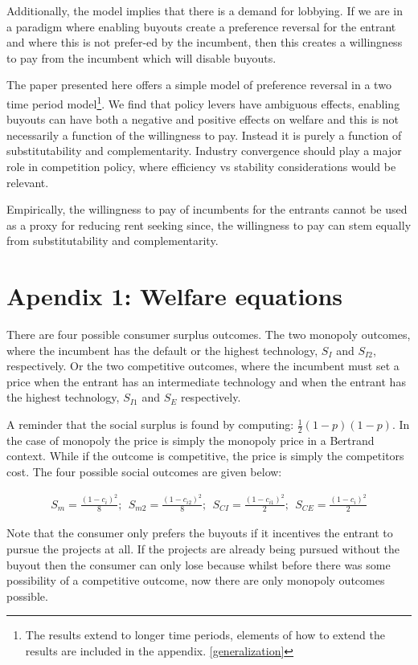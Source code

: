 \documentclass[11pt]{article}
\begin{document}
Additionally, the model implies that there is a demand for lobbying. If we are in a paradigm where enabling buyouts create a preference reversal for the entrant and where this is not prefer-ed by the incumbent, then this creates a willingness to pay from the incumbent which will disable buyouts. 


The paper presented here offers a simple model of preference reversal in a two time period model\footnote{The results extend to longer time periods, elements of how to extend the results are included in the appendix. \ref{generalization}}. We find that policy levers have ambiguous effects, enabling buyouts can have both a negative and positive effects on welfare and this is not necessarily a function of the willingness to pay. Instead it is purely a function of substitutability and complementarity. Industry convergence should play a major role in competition policy, where efficiency vs stability considerations would be relevant. 

Empirically, the willingness to pay of incumbents for the entrants cannot be used as a proxy for reducing rent seeking since, the willingness to pay can stem equally from substitutability and complementarity. 


\newpage
\section*{Apendix 1: Welfare equations}

There are four possible consumer surplus outcomes. The two monopoly outcomes, where the incumbent has the default or the highest technology, $S_I$ and $S_{I2}$, respectively. Or the two competitive outcomes, where the incumbent must set a price when the entrant has an intermediate technology and when the entrant has the highest technology, $S_{I1}$ and $S_{E}$ respectively. 

A reminder that the social surplus is found by computing:
$\frac{1}{2}(1- p)(1-p)$. In the case of monopoly the price is simply the monopoly price in a Bertrand context. While if the outcome is competitive, the price is simply the competitors cost. The four possible  social outcomes are given below:

\begin{align*}
S_{m} =  \frac{(1-c_i)^2}{8};  ~~
S_{m2}=  \frac{(1-c_{i2})^2}{8}; ~~
S_{CI} = \frac{(1-c_{i1})^2}{2};~~
S_{CE} =  \frac{(1-c_i)^2}{2}
\end{align*}

Note that the consumer only prefers the buyouts if it incentives the entrant to pursue the projects at all. If the projects are already being pursued without the buyout then the consumer can only lose because whilst before there was some possibility of a competitive outcome, now there are only monopoly outcomes possible. 
\end{document}
